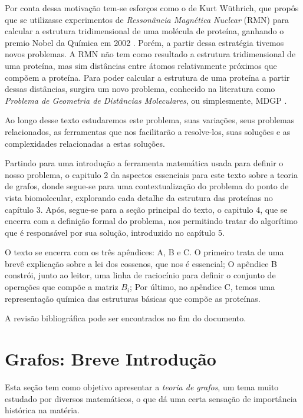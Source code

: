 \documentclass[a4paper,12pt]{article}
\begin{document}
	Por conta dessa motivação tem-se esforços como o de Kurt Wüthrich, que propôs que se utilizasse experimentos de \textit{Ressonância Magnética Nuclear}
	(RMN) para calcular a estrutura tridimensional de uma molécula de proteína, ganhando o premio Nobel da Química em 2002 \cite{RMNproteinWrutrich}. Porém, a partir dessa estratégia tivemos novos problemas. A RMN não tem como resultado a estrutura tridimensional de uma proteína, mas sim distâncias entre átomos relativamente próximos que compõem a proteína. Para poder calcular a estrutura de uma proteína a partir dessas distâncias, surgira um novo problema, conhecido na literatura como \textit{Problema de Geometria de Distâncias Moleculares}, ou simplesmente, MDGP \cite{carlileGDandAplications}.
	
	Ao longo desse texto estudaremos este problema, suas variações, seus problemas relacionados, as ferramentas que nos facilitarão a resolve-los, suas soluções e as complexidades relacionadas a estas soluções. 
	
	Partindo para uma introdução a ferramenta matemática usada para definir o nosso problema, o capitulo 2 da aspectos essenciais para este texto sobre a teoria de grafos, donde segue-se para uma contextualização do problema do ponto de vista biomolecular, explorando cada detalhe da estrutura das proteínas no capítulo 3. Após, segue-se para a seção principal do texto, o capitulo 4, que se encerra com a definição formal do problema, nos permitindo tratar do algorítimo que é responsável por sua solução, introduzido no capítulo 5.
	
	O texto se encerra com os três apêndices: A, B e C. O primeiro trata de uma brevê explicação sobre a lei dos cossenos, que nos é essencial; O apêndice B constrói, junto ao leitor, uma linha de raciocínio para definir o conjunto de operações que compõe a matriz $B_i$; Por último, no apêndice C, temos uma representação química das estruturas básicas que compõe as proteínas.
	
	A revisão bibliográfica pode ser encontrados no fim do documento. 
	
	\newpage
	
	\section{Grafos: Breve Introdução}
	Esta seção tem como objetivo apresentar a \textit{teoria de grafos}, um tema muito estudado por diversos matemáticos, o que dá uma certa sensação de importância histórica na matéria.
	
\end{document}
